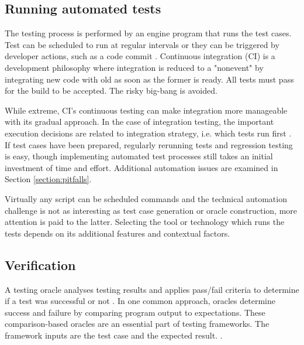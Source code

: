 \documentclass[12pt,a4paper,oneside,pdftex]{report}
\begin{document}
{\subsection{Running automated tests}

The testing process is performed by an engine program that runs the test cases. Test can be scheduled to run at regular intervals or they can be triggered by developer actions, such as a code commit \citep{pezze2008software}. Continuous integration (CI) is a development philosophy where integration is reduced to a "nonevent" by integrating new code with old as soon as the former is ready. All tests must pass for the build to be accepted. \citep{duvall2007continuous} The risky big-bang is avoided.

While extreme, CI's continuous testing can make integration more manageable with its gradual approach. In the case of integration testing, the important execution decisions are related to integration strategy, i.e. which tests run first \citep{duvall2007continuous}. If test cases have been prepared, regularly rerunning tests and regression testing is easy, though implementing automated test processes still takes an initial investment of time and effort. Additional automation issues are examined in Section \ref{section:pitfalls}. %

Virtually any script can be scheduled commands and the technical automation challenge is not as interesting as test case generation or oracle construction, more attention is paid to the latter. Selecting the tool or technology which runs the tests depends on its additional features and contextual factors.


\subsection{Verification}
A testing oracle analyses testing results and applies pass/fail criteria to determine if a test was successful or not \citep{pezze2008software, burnstein2003practical}. In one common approach, oracles determine success and failure by comparing program output to expectations. These comparison-based oracles are an essential part of testing frameworks. The framework inputs are the test case and the expected result. \citep{pezze2008software}. 

}
\end{document}
